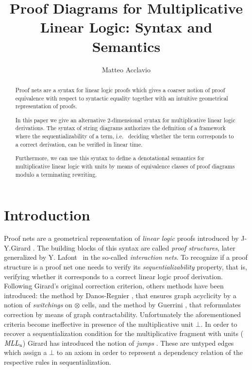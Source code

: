 \documentclass[a4paper]{article}
\begin{document}
\title{Proof Diagrams for Multiplicative Linear Logic: Syntax and Semantics}
\author{Matteo Acclavio}




\maketitle

\begin{abstract}
Proof nets are a syntax for linear logic proofs which gives a coarser notion of proof equivalence with respect to  syntactic equality together with an intuitive geometrical representation of proofs.

In this paper we give an alternative $2$-dimensional syntax for multiplicative linear logic derivations. The syntax of string diagrams authorizes the definition of a framework where the sequentializability of a term, i.e.~ deciding whether the term corresponds to a correct derivation, can be verified in linear time. 

Furthermore, we can use this syntax to define a denotational semantics for multiplicative linear logic with units by means of equivalence classes of proof diagrams modulo a terminating rewriting.
\end{abstract}






\section{Introduction}
Proof nets are a geometrical representation of \emph{linear logic} proofs  introduced by J-Y.Girard \cite{girll}. The building blocks of this syntax are called \emph{proof structures}, later generalized by Y. Lafont~\cite{lafint} in the so-called \emph{interaction nets}. 
To recognize if a proof structure is a proof net one needs to verify its \emph{sequentializability} property, that is, verifying whether it corresponds to a correct linear logic proof derivation.
Following Girard's original correction criterion, others methods have been introduced: the method by Danos-Regnier \cite{dan-reg}, that ensures graph acyclicity by a notion of  \emph{switchings} on $\otimes$ cells, and the method by Guerrini \cite{guerrini}, that reformulates correction by means of graph contractability. Unfortunately the aforementioned criteria become ineffective in presence of the multiplicative unit $\bot$. In order to recover a sequentialization condition for the multiplicative fragment with units ($\mathit{MLL_u}$)  Girard has introduced the notion of \emph{jumps} \cite{girjump}. These are untyped edges which assign a $\bot$ to an axiom in order to represent a dependency relation of the respective rules in sequentialization. 
\end{document}
